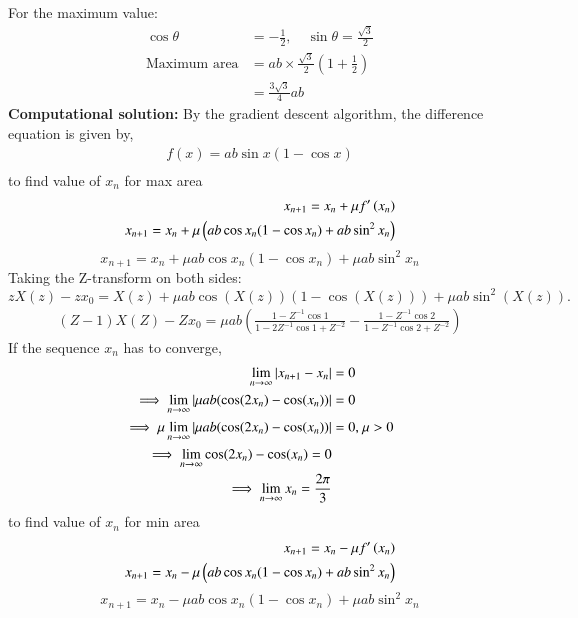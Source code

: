 \documentclass[journal]{IEEEtran}
\begin{document}
	For the maximum value:
	\begin{align}
		\cos\theta &= -\frac{1}{2}, \quad \sin\theta = \frac{\sqrt{3}}{2} \\
		\text{Maximum area} &= ab \times \frac{\sqrt{3}}{2} \left( 1 + \frac{1}{2} \right) \\
		&= \frac{3\sqrt{3}}{4} ab
	\end{align}
	\textbf{Computational solution:}
	\newline
	By the gradient descent algorithm, the difference equation is given by,
	\begin{align}
		f(x)=ab \sin{x} (1 - \cos{x})\\
	\end{align}
	to find value of $x_n$ for max area\\
	\begin{align}
		x_{n + 1} = x_n + \mu f^{\prime}\left(x_{n}\right)\\
		x_{n + 1} = x_n + \mu \left(ab \cos{x_{n}} (1 - \cos{x_{n}}) + ab \sin^2{x_{n}}\right)
	\end{align}
	\[
	x_{n+1} = x_n + \mu ab \cos x_n (1 - \cos x_n) + \mu ab \sin^2 x_n
	\]
	Taking the Z-transform on both sides:
	\[
	zX(z) - zx_0 = X(z) + \mu ab \cos(X(z))(1 - \cos(X(z))) + \mu ab \sin^2(X(z)).
	\]
	\begin{align}
		(Z-1)X(Z)-Zx_{0}={\mu}ab\left(\frac{1-Z^{-1}\cos{1}}{1-2Z^{-1}\cos{1}+Z^{-2}}-\frac{1-Z^{-1}\cos{2}}{1-Z^{-1}\cos{2}+Z^{-2}}\right)
	\end{align}
	If the sequence $x_n$ has to converge,
	\begin{align}
		\lim_{n\to\infty} \left\vert x_{n + 1} - x_n\right\vert &= 0\\
		\implies \lim_{n\to\infty} \left\vert{\mu}ab(\cos(2x_{n})-\cos(x_{n}))\right\vert &= 0\\
		\implies \mu \lim_{n\to\infty} \left\vert{\mu}ab(\cos(2x_{n})-\cos(x_{n}))\right\vert &= 0 \text{, } \mu > 0\\
		\implies \lim_{n\to\infty} \cos(2x_{n})-\cos(x_{n}) = 0\\
		\implies \lim_{n\to\infty} x_{n} = \frac{2\pi}{3}
	\end{align}
	to find value of $x_n$ for min area\\
	\begin{align}
		x_{n + 1} = x_n - \mu f^{\prime}\left(x_{n}\right)\\
		x_{n + 1} = x_n - \mu \left(ab \cos{x_{n}} (1 - \cos{x_{n}}) + ab \sin^2{x_{n}}\right)
	\end{align}
	\[
	x_{n+1} = x_n - \mu ab \cos x_n (1 - \cos x_n) + \mu ab \sin^2 x_n
	\]
\end{document}
